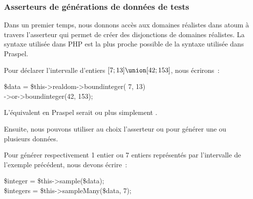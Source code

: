 \subsubsection{Asserteurs de générations de données de tests}

Dans un premier temps, nous donnons accès aux domaines réalistes dans atoum à
travers l'asserteur  qui permet de créer des disjonctions de
domaines réalistes. La syntaxe utilisée dans PHP est la plus proche possible de
la syntaxe utilisée dans Praspel.

\begin{example}

Pour déclarer l'intervalle d'entiers $[7; 13] \union [42; 153]$, nous écrirons~:
%
\begin{pre}
\$data = \$this->realdom->boundinteger( 7,  13) \\
                  ->or->boundinteger(42, 153);
\end{pre}
%
L'équivalent en Praspel serait  ou plus simplement .

\end{example}

Ensuite, nous pouvons utiliser au choix l'asserteur  ou
 pour générer une ou plusieurs données.

\begin{example}

Pour générer respectivement 1 entier ou 7 entiers représentés par l'intervalle
de l'exemple précédent, nous devons écrire~:
%
\begin{pre}
\$integer  = \$this->sample(\$data); \\
\$integers = \$this->sampleMany(\$data, 7);
\end{pre}

\end{example}

